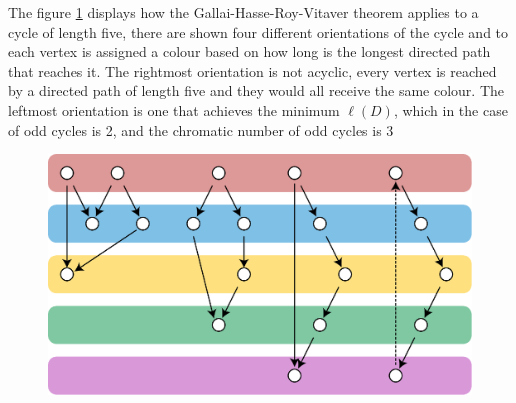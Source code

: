 \documentclass[a4paper,12pt,oneside]{book}
\begin{document}
 
The figure \ref{fig-vitaver} displays how the Gallai-Hasse-Roy-Vitaver theorem applies to a cycle of length five, there are shown four different orientations of the cycle and to each vertex is assigned a colour based on how long is the longest directed path that reaches it. The rightmost orientation is not acyclic, every vertex is reached by a directed path of length five and they would all receive the same colour. The leftmost orientation is one that achieves the minimum $\ell(D)$, which in the case of odd cycles is 2, and the chromatic number of odd cycles is 3
\vspace{2cm}
\begin{figure}[h]
\centering\includegraphics[scale=0.7]{vitaver.eps}
\caption{ }\label{fig-vitaver}
\end{figure}

\newpage
\end{document}
